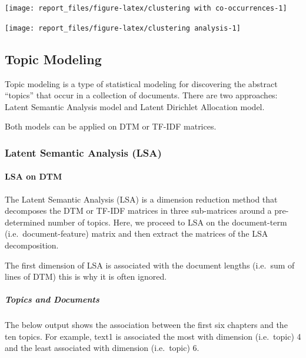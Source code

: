 \documentclass[
]{article}
\begin{document}
\begin{center}\texttt{[image: report\_files/figure-latex/clustering with co-occurrences-1]} \end{center}

\begin{center}\texttt{[image: report\_files/figure-latex/clustering analysis-1]} \end{center}

\hypertarget{topic-modeling}{%
\subsection{Topic Modeling}\label{topic-modeling}}

Topic modeling is a type of statistical modeling for discovering the
abstract ``topics'' that occur in a collection of documents. There are
two approaches: Latent Semantic Analysis model and Latent Dirichlet
Allocation model.

Both models can be applied on DTM or TF-IDF matrices.

\hypertarget{latent-semantic-analysis-lsa}{%
\subsubsection{Latent Semantic Analysis
(LSA)}\label{latent-semantic-analysis-lsa}}

\hypertarget{lsa-on-dtm}{%
\paragraph{LSA on DTM}\label{lsa-on-dtm}}

The Latent Semantic Analysis (LSA) is a dimension reduction method that
decomposes the DTM or TF-IDF matrices in three sub-matrices around a
pre-determined number of topics. Here, we proceed to LSA on the
document-term (i.e.~document-feature) matrix and then extract the
matrices of the LSA decomposition.

The first dimension of LSA is associated with the document lengths
(i.e.~sum of lines of DTM) this is why it is often ignored.

\hypertarget{topics-and-documents}{%
\subparagraph{Topics and Documents}\label{topics-and-documents}}

The below output shows the association between the first six chapters
and the ten topics. For example, text1 is associated the most with
dimension (i.e.~topic) 4 and the least associated with dimension
(i.e.~topic) 6.
\end{document}
